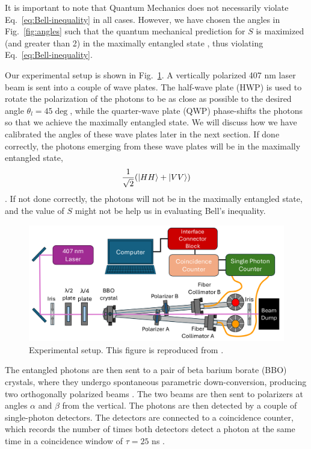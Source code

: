 \documentclass{../paper}
\newcommand{\eq}[1]{Eq.~\eqref{#1}}
\newcommand{\fig}[1]{Fig.~\ref{#1}}
\begin{document}
It is important to note that Quantum Mechanics does not necessarily violate \eq{eq:Bell-inequality} in all cases. However, we have chosen the angles in \fig{fig:angles} such that the quantum mechanical prediction for $S$ is maximized (and greater than 2) in the maximally entangled state \cite{Dehlinger2002}, thus violating \eq{eq:Bell-inequality}.

Our experimental setup is shown in \fig{fig:setup}. A vertically polarized 407 nm laser beam is sent into a couple of wave plates. The half-wave plate (HWP) is used to rotate the polarization of the photons to be as close as possible to the desired angle $\theta_l = 45\deg$, while the quarter-wave plate (QWP) phase-shifts the photons so that we achieve the maximally entangled state. We will discuss how we have calibrated the angles of these wave plates later in the next section. If done correctly, the photons emerging from these wave plates will be in the maximally entangled state,
\begin{equation}\label{eq:entangled-state}
  \frac{1}{\sqrt{2}} (\ket{HH} + \ket{VV})
\end{equation}
\cite{LabManual}. If not done correctly, the photons will not be in the maximally entangled state, and the value of $S$ might not be help us in evaluating Bell's inequality.

\begin{figure}
  \centering
  \includegraphics[width=1.0\columnwidth]{assets/setup.png}
  \caption{Experimental setup. This figure is reproduced from \cite{LabManual}.}
  \label{fig:setup}
\end{figure}

The entangled photons are then sent to a pair of beta barium borate (BBO) crystals, where they undergo spontaneous parametric down-conversion, producing two orthogonally polarized beams \cite{Dehlinger2002}. The two beams are then sent to polarizers at angles $\alpha$ and $\beta$ from the vertical. The photons are then detected by a couple of single-photon detectors. The detectors are connected to a coincidence counter, which records the number of times both detectors detect a photon at the same time in a coincidence window of $\tau = 25$ ns \cite{LabManual}.
\end{document}
